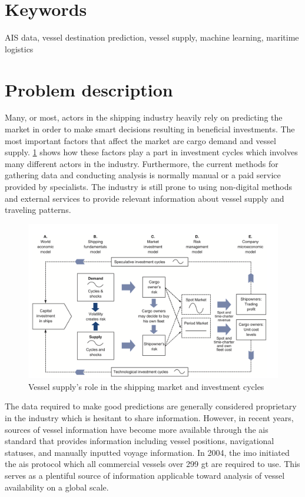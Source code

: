 \section{Keywords}

AIS data, vessel destination prediction, vessel supply, machine learning, maritime logistics

\section{Problem description}
\label{sec:problem_desc}

Many, or most, actors in the shipping industry heavily rely on predicting the market in order to make smart decisions resulting in beneficial investments. The most important factors that affect the market are cargo demand and vessel supply. \cref{fig:maritime_economics} shows how these factors play a part in investment cycles which involves many different actors in the industry. Furthermore, the current methods for gathering data and conducting analysis is normally manual or a paid service provided by specialists. The industry is still prone to using non-digital methods and external services to provide relevant information about vessel supply and traveling patterns.

\begin{figure}[htbp]
    \centering
    \includegraphics[width=.9\textwidth]{figures/investment_cycle}
    \caption{Vessel supply’s role in the shipping market and investment cycles \parencite{stopford2008}}
    \label{fig:maritime_economics}
\end{figure}

The data required to make good predictions are generally considered proprietary in the industry which is hesitant to share information. However, in recent years, sources of vessel information have become more available through the \acrshort{ais} standard that provides information including vessel positions, navigational statuses, and manually inputted voyage information. In 2004, the \acrfull{imo} initiated the \acrshort{ais} protocol which all commercial vessels over 299 \acrfull{gt} are required to use. This serves as a plentiful source of information applicable toward analysis of vessel availability on a global scale.

